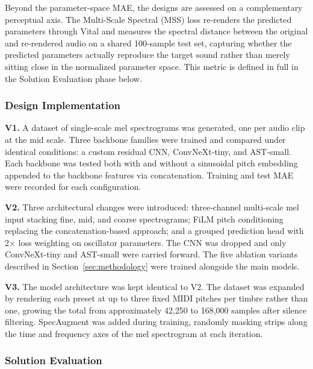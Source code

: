 \par \vspace{0.3cm}
\noindent Beyond the parameter-space MAE, the designs are assessed on a complementary perceptual axis. The Multi-Scale Spectral (MSS) loss re-renders the predicted parameters through Vital and measures the spectral distance between the original and re-rendered audio on a shared 100-sample test set, capturing whether the predicted parameters actually reproduce the target sound rather than merely sitting close in the normalized parameter space. This metric is defined in full in the Solution Evaluation phase below.

\subsubsection{Design Implementation}

\noindent \textbf{V1.} A dataset of single-scale mel spectrograms was generated, one per audio clip at the mid scale. Three backbone families were trained and compared under identical conditions: a custom residual CNN, ConvNeXt-tiny, and AST-small. Each backbone was tested both with and without a sinusoidal pitch embedding appended to the backbone features via concatenation. Training and test MAE were recorded for each configuration.

\par \vspace{0.3cm}
\noindent \textbf{V2.} Three architectural changes were introduced: three-channel multi-scale mel input stacking fine, mid, and coarse spectrograms; FiLM pitch conditioning replacing the concatenation-based approach; and a grouped prediction head with 2$\times$ loss weighting on oscillator parameters. The CNN was dropped and only ConvNeXt-tiny and AST-small were carried forward. The five ablation variants described in Section~\ref{sec:methodology} were trained alongside the main models.

\par \vspace{0.3cm}
\noindent \textbf{V3.} The model architecture was kept identical to V2. The dataset was expanded by rendering each preset at up to three fixed MIDI pitches per timbre rather than one, growing the total from approximately 42{,}250 to 168{,}000 samples after silence filtering. SpecAugment was added during training, randomly masking strips along the time and frequency axes of the mel spectrogram at each iteration.

\subsubsection{Solution Evaluation}

